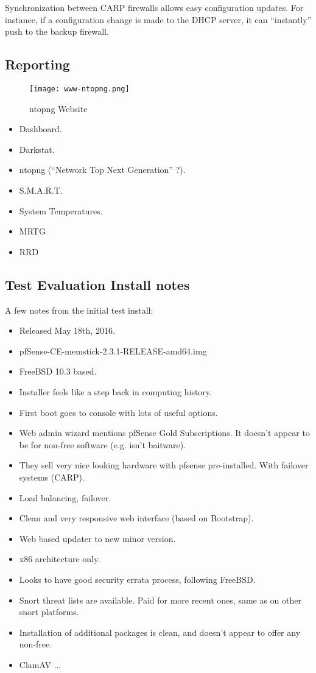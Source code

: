 Synchronization between CARP firewalls allows easy configuration updates. For
instance, if a configuration change is made to the DHCP server, it can
``instantly'' push to the backup firewall.


\subsection{Reporting}

\begin{figure}[h!]
\texttt{[image: www-ntopng.png]}
 \caption{ntopng Website}
 \label{fig:www-ntopng}
\end{figure}

\begin{itemize}
 \item Dashboard.
 \item Darkstat.
 \item ntopng (``Network Top Next Generation'' ?).
 \item S.M.A.R.T.
 \item System Temperatures.
 \item MRTG
 \item RRD
\end{itemize}


\subsection{Test Evaluation Install notes}

A few notes from the initial test install:

\begin{itemize}
 \item Released May 18th, 2016.
 \item pfSense-CE-memstick-2.3.1-RELEASE-amd64.img
 \item FreeBSD 10.3 based.
 \item Installer feels like a step back in computing history.
 \item First boot goes to console with lots of useful options.
 \item Web admin wizard mentions pfSense Gold Subscriptions. It doesn't appear to be for non-free software (e.g. isn't baitware).
 \item They sell very nice looking hardware with pfsense pre-installed. With failover systems (CARP).
 \item Load balancing, failover.
 \item Clean and very responsive web interface (based on Bootstrap).
 \item Web based updater to new minor version.
 \item x86 architecture only.
 \item Looks to have good security errata process, following FreeBSD.
 \item Snort threat lists are available. Paid for more recent ones, same as on other snort platforms.
 \item Installation of additional packages is clean, and doesn't appear to offer any non-free.
 \item ClamAV ...
\end{itemize}

